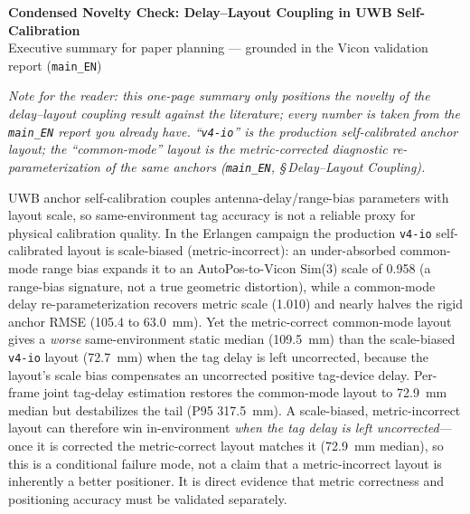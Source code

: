 \documentclass[10pt,a4paper]{article}
\makeatletter
\renewcommand\section{\@startsection{section}{1}{0pt}{0.65ex plus .2ex}{0.35ex}{\normalfont\normalsize\bfseries}}
\makeatother
\begin{document}
\small

\begin{center}
{\large\bfseries Condensed Novelty Check: Delay--Layout Coupling in UWB Self-Calibration}\\[-0.1em]
{\small Executive summary for paper planning --- grounded in the Vicon validation report (\texttt{main\_EN})}
\end{center}

\vspace{0.2em}
{\small\itshape Note for the reader: this one-page summary only positions the novelty of the delay--layout coupling result against the literature; every number is taken from the \texttt{main\_EN} report you already have. ``\texttt{v4-io}'' is the production self-calibrated anchor layout; the ``common-mode'' layout is the metric-corrected diagnostic re-parameterization of the same anchors (\texttt{main\_EN}, \S\,Delay--Layout Coupling).}
\vspace{0.2em}

\section{Thesis}

UWB anchor self-calibration couples antenna-delay/range-bias parameters with layout scale, so same-environment tag accuracy is not a reliable proxy for physical calibration quality. In the Erlangen campaign the production \texttt{v4-io} self-calibrated layout is scale-biased (metric-incorrect): an under-absorbed common-mode range bias expands it to an AutoPos-to-Vicon Sim(3) scale of 0.958 (a range-bias signature, not a true geometric distortion), while a common-mode delay re-parameterization recovers metric scale (1.010) and nearly halves the rigid anchor RMSE (105.4 to 63.0~mm). Yet the metric-correct common-mode layout gives a \emph{worse} same-environment static median (109.5~mm) than the scale-biased \texttt{v4-io} layout (72.7~mm) when the tag delay is left uncorrected, because the layout's scale bias compensates an uncorrected positive tag-device delay. Per-frame joint tag-delay estimation restores the common-mode layout to 72.9~mm median but destabilizes the tail (P95 317.5~mm). A scale-biased, metric-incorrect layout can therefore win in-environment \emph{when the tag delay is left uncorrected}---once it is corrected the metric-correct layout matches it (72.9~mm median), so this is a conditional failure mode, not a claim that a metric-incorrect layout is inherently a better positioner. It is direct evidence that metric correctness and positioning accuracy must be validated separately.
\end{document}
